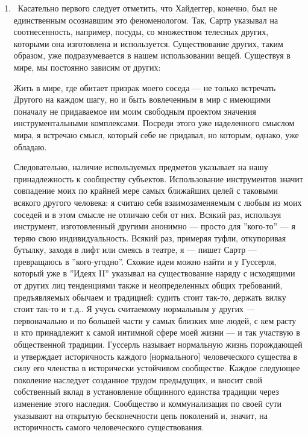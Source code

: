 \documentclass[11pt]{book}
\begin{document}
\begin{enumerate}
  \item\ Касательно первого следует отметить, что Хайдеггер, конечно, был не единственным осознавшим это феноменологом. Так, Сартр указывал на соотнесенность, например, посуды, со множеством телесных других, которыми она изготовлена и используется. Существование других, таким образом, уже подразумевается в нашем использовании вещей. Существуя в мире, мы постоянно зависим от других:

\smallskip
{}\relax
{}\relax

Жить в мире, где обитает призрак моего соседа --- не только встречать Другого на каждом шагу, но и быть вовлеченным в мир с имеющими поначалу не придаваемое им моим свободным проектом значения инструментальными комплексами. Посреди этого уже наделенного смыслом мира, я встречаю смысл, который себе не придавал, но которым, однако, уже обладаю.

\relax
{}\relax
\smallskip

Следовательно, наличие используемых предметов указывает на нашу принадлежность к сообществу субъектов. Использование инструментов значит совпадение моих по крайней мере самых ближайших целей с таковыми всякого другого человека: я считаю себя взаимозаменяемым с любым из моих соседей и в этом смысле не отличаю себя от них. Всякий раз, используя инструмент, изготовленный другими анонимно --- просто для ''кого-то'' --- я теряю свою индивидуальность. Всякий раз, примеряя туфли, откупоривая бутылку, заходя в лифт или смеясь в театре, я --- пишет Сартр --- превращаюсь в ''кого-угодно''. Схожие идеи можно найти и у Гуссерля, который уже в ''Идеях II'' указывал на существование наряду с исходящими от других лиц тенденциями также и неопределенных общих требований, предъявляемых обычаем и традицией: судить стоит так-то, держать вилку стоит так-то и т.д.. Я учусь считаемому нормальным у других --- первоначально и по большей части у самых близких мне людей, с кем расту и кто принадлежит к самой интимной сфере моей жизни --- и так участвую в общественной традиции. Гуссерль называет нормальную жизнь порождающей и утверждает историчность каждого [нормального] человеческого существа в силу его членства в исторически устойчивом сообществе. Каждое следующее поколение наследует созданное трудом предыдущих, и вносит свой собственный вклад в установление общинного единства традиции через изменение этого наследия. Сообщество и коммунализация по своей сути указывают на открытую бесконечности цепь поколений и, значит, на историчность самого человеческого существования.


\end{enumerate}
\end{document}
